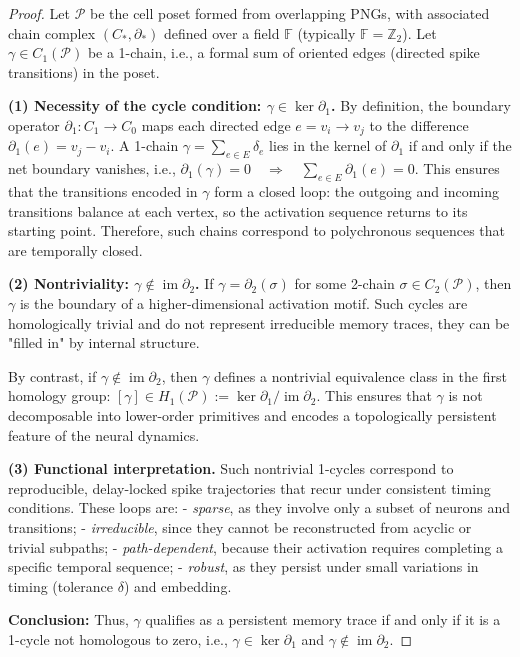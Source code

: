 \documentclass[lettersize,journal]{IEEEtran}
\begin{document}
\begin{proof}
Let \( \mathcal{P} \) be the cell poset formed from overlapping PNGs, with associated chain complex \( (C_*, \partial_*) \) defined over a field \( \mathbb{F} \) (typically \( \mathbb{F} = \mathbb{Z}_2 \)).
Let \( \gamma \in C_1(\mathcal{P}) \) be a 1-chain, i.e., a formal sum of oriented edges (directed spike transitions) in the poset.

\textbf{(1) Necessity of the cycle condition: \( \gamma \in \ker \partial_1 \).}  
By definition, the boundary operator \( \partial_1: C_1 \to C_0 \) maps each directed edge \( e = v_i \to v_j \) to the difference \( \partial_1(e) = v_j - v_i \).  
A 1-chain \( \gamma = \sum_{e \in E} \delta_e \) lies in the kernel of \( \partial_1 \) if and only if the net boundary vanishes, i.e.,
$\partial_1(\gamma) = 0 \quad \Rightarrow \quad \sum_{e \in E} \partial_1(e) = 0$.
This ensures that the transitions encoded in \( \gamma \) form a closed loop: the outgoing and incoming transitions balance at each vertex, so the activation sequence returns to its starting point. Therefore, such chains correspond to polychronous sequences that are temporally closed.

\textbf{(2) Nontriviality: \( \gamma \notin \operatorname{im} \partial_2 \).}  
If \( \gamma = \partial_2(\sigma) \) for some 2-chain \( \sigma \in C_2(\mathcal{P}) \), then \( \gamma \) is the boundary of a higher-dimensional activation motif. Such cycles are homologically trivial and do not represent irreducible memory traces, they can be "filled in" by internal structure.

By contrast, if \( \gamma \notin \operatorname{im} \partial_2 \), then \( \gamma \) defines a nontrivial equivalence class in the first homology group:
$[\gamma] \in H_1(\mathcal{P}) := \ker \partial_1 / \operatorname{im} \partial_2$.
This ensures that \( \gamma \) is not decomposable into lower-order primitives and encodes a topologically persistent feature of the neural dynamics.

\textbf{(3) Functional interpretation.}  
Such nontrivial 1-cycles correspond to reproducible, delay-locked spike trajectories that recur under consistent timing conditions. These loops are:
- \emph{sparse}, as they involve only a subset of neurons and transitions;
- \emph{irreducible}, since they cannot be reconstructed from acyclic or trivial subpaths;
- \emph{path-dependent}, because their activation requires completing a specific temporal sequence;
- \emph{robust}, as they persist under small variations in timing (tolerance \( \delta \)) and embedding.


\textbf{Conclusion:}  
Thus, \( \gamma \) qualifies as a persistent memory trace if and only if it is a 1-cycle not homologous to zero, i.e., \( \gamma \in \ker \partial_1 \) and \( \gamma \notin \operatorname{im} \partial_2 \). 
\end{proof}
\end{document}
